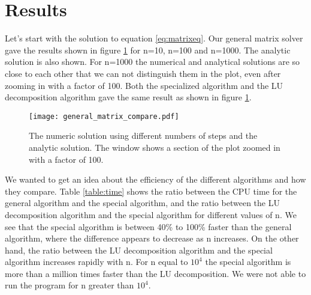 \section{Results}
\label{sec:results}


%
%

Let's start with the solution to equation \ref{eq:matrixeq}. Our general matrix solver gave the results shown in figure \ref{fig:compare} for n=10, n=100 and n=1000. The analytic solution is also shown. For n=1000 the numerical and analytical solutions are so close to each other that we can not distinguish them in the plot, even after zooming in with a factor of 100. Both the specialized algorithm and the LU decomposition algorithm gave the same result as shown in figure \ref{fig:compare}. 
\begin{figure}[htbp]
	\centering
	\texttt{[image: general\_matrix\_compare.pdf]}
	\caption{The numeric solution using different numbers of steps and the analytic solution. The window shows a section of the plot zoomed in with a factor of 100.}
	\label{fig:compare}
\end{figure}

We wanted to get an idea about the efficiency of the different algorithms and how they compare. Table \ref{table:time} shows the ratio between the CPU time for the general algorithm and the special algorithm, and the ratio between the LU decomposition algorithm and the special algorithm for different values of n. We see that the special algorithm is between 40\% to 100\% faster than the general algorithm, where the difference appears to decrease as n increases. On the other hand, the ratio between the LU decomposition algorithm and the special algorithm increases rapidly with n. For n equal to $10^4$ the special algorithm is more than a million times faster than the LU decomposition. We were not able to run the program for n greater than $10^4$.  

